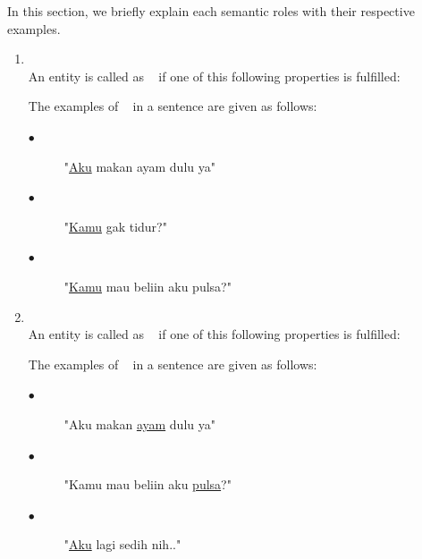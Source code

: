 In this section, we briefly explain each semantic roles with their respective examples.
\begin{enumerate}
	\item \agent\\
	An entity is called as \agent~ if one of this following properties is fulfilled:
	
	The examples of \agent~ in a sentence are given as follows:
	\begin{description}
		\item[$\bullet$] "\underline{Aku} makan ayam dulu ya"
		\item[$\bullet$] "\underline{Kamu} gak tidur?"
		\item[$\bullet$] "\underline{Kamu} mau beliin aku pulsa?"
	\end{description}
	
	\item \patient\\
	An entity is called as \patient~ if one of this following properties is fulfilled:
	
	The examples of \patient~ in a sentence are given as follows:
	\begin{description}
		\item[$\bullet$] "Aku makan \underline{ayam} dulu ya"
		\item[$\bullet$] "Kamu mau beliin aku \underline{pulsa}?"
		\item[$\bullet$] "\underline{Aku} lagi sedih nih.."
	\end{description}


\end{enumerate}
